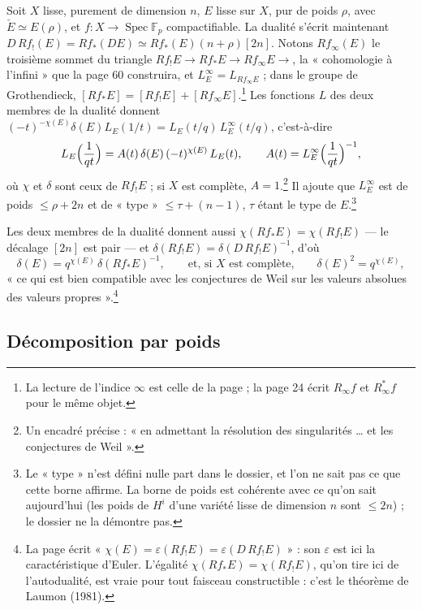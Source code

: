 \documentclass[11pt,a4paper]{article}
\begin{document}
Soit $X$ lisse, purement de dimension $n$, $E$ lisse sur $X$, pur de poids
$\rho$, avec $\check E \simeq E(\rho)$, et
$f : X \to \operatorname{Spec}\mathbb{F}_p$ compactifiable. La dualité
s'écrit maintenant $D\,Rf_{!}(E) = Rf_{*}(DE) \simeq Rf_{*}(E)(n + \rho)[2n]$.
Notons $Rf_{\infty}(E)$ le troisième sommet du triangle
$Rf_{!}E \to Rf_{*}E \to Rf_{\infty}E \to$, la « cohomologie à l'infini » que la
page 60 construira, et $L^{\infty}_E = L_{Rf_{\infty}E}$ ; dans le groupe de
Grothendieck, $[Rf_{*}E] = [Rf_{!}E] + [Rf_{\infty}E]$.\footnote{La lecture de
l'indice $\infty$ est celle de la page ; la page 24 écrit
$R_\infty f$ et $R^{*}_\infty f$ pour le même objet.} Les fonctions $L$ des deux
membres de la dualité donnent
$(-t)^{-\chi(E)}\delta(E)L_E(1/t) = L_E(t/q)\,L^{\infty}_E(t/q)$, c'est-à-dire
\[
  L_E\Bigl(\frac{1}{qt}\Bigr) = A(t)\,\delta(E)\,(-t)^{\chi(E)}\,L_E(t),
  \qquad A(t) = L^{\infty}_E\Bigl(\frac{1}{qt}\Bigr)^{-1},
\]
où $\chi$ et $\delta$ sont ceux de $Rf_{!}E$ ; si $X$ est complète,
$A = 1$.\footnote{Un encadré précise : « en admettant la résolution des
singularités … et les conjectures de Weil ».} Il ajoute que $L^{\infty}_E$ est
de poids $\le \rho + 2n$ et de « type » $\le \tau + (n - 1)$, $\tau$ étant le
type de $E$.\footnote{Le « type » n'est défini nulle part dans le dossier, et
l'on ne sait pas ce que cette borne affirme. La borne de poids est cohérente
avec ce qu'on sait aujourd'hui (les poids de $H^i$ d'une variété lisse de
dimension $n$ sont $\le 2n$) ; le dossier ne la démontre pas.}

Les deux membres de la dualité donnent aussi
$\chi(Rf_{*}E) = \chi(Rf_{!}E)$ --- le décalage $[2n]$ est pair --- et
$\delta(Rf_{!}E) = \delta(D\,Rf_{!}E)^{-1}$, d'où
\[
  \delta(E) = q^{\chi(E)}\,\delta(Rf_{*}E)^{-1},
  \qquad\text{et, si $X$ est complète,}\qquad \delta(E)^2 = q^{\chi(E)},
\]
« ce qui est bien compatible avec les conjectures de Weil sur les valeurs
absolues des valeurs propres ».\footnote{La page écrit
« $\chi(E) = \varepsilon(Rf_{!}E) = \varepsilon(D\,Rf_{!}E)$ » : son
$\varepsilon$ est ici la caractéristique d'Euler. L'égalité
$\chi(Rf_{*}E) = \chi(Rf_{!}E)$, qu'on tire ici de l'autodualité, est vraie
pour tout faisceau constructible : c'est le théorème de Laumon (1981).}

\subsection*{Décomposition par poids}
\end{document}
